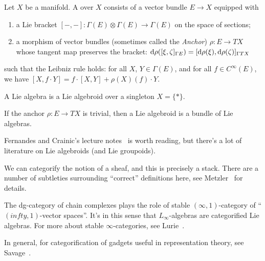 \begin{node}\label{hda-000C}%
\begin{definition}\label{hda-0003}%
Let $X$ be a manifold. A  over $X$ consists of
a vector bundle $E\to X$ equipped with
\begin{enumerate}
\item a Lie bracket $[-,-]\colon\Gamma(E)\otimes\Gamma(E)\to\Gamma(E)$
  on the space of sections;
\item a morphism of vector bundles (sometimes called the \textit{Anchor})
  $\rho\colon E\to TX$ whose tangent map preserves the bracket:
  $\mathrm{d}\rho([\xi,\zeta]_{\Gamma E})=[\mathrm{d}\rho(\xi),\mathrm{d}\rho(\zeta)]_{\Gamma TX}$
\end{enumerate}
such that the Leibniz rule holds: for all $X$, $Y\in\Gamma(E)$, and for
all $f\in C^{\infty}(E)$, we have $[X,f\cdot Y]=f\cdot[X,Y]+\rho(X)(f)\cdot Y$.
\end{definition}

\begin{node}[Examples]\label{hda-000D}%

\begin{node}\label{hda-000E}%
A Lie algebra is a Lie algebroid over a singleton $X=\{*\}$.
\end{node}

\begin{node}\label{hda-000F}%
If the anchor $\rho\colon E\to TX$ is trivial, then a Lie algebroid is a
bundle of Lie algebras.
\end{node}
\end{node}

\begin{node}\label{hda-000G}%
Fernandes and Crainic's lecture notes~\cite{fernandes2006lectures}
is worth reading, but there's a lot of literature on Lie algebroids (and
Lie groupoids).
\end{node}
\end{node}

\begin{node}[Stacks]\label{hda-000H}%
We can categorify the notion of a sheaf, and this is precisely a
stack. There are a number of subtleties surrounding ``correct''
definitions here, see Metzler~\cite{metzler2003topological} for details.
\end{node}

\begin{node}\label{hda-000I}%
The dg-category of chain complexes plays the role of stable
$(\infty,1)$-category of ``$(infty,1)$-vector spaces''. It's in this
sense that $L_{\infty}$-algebras are categorified Lie algebras. For more
about stable $\infty$-categories, see Lurie~\cite{lurie2009stable}.
\end{node}

\begin{node}\label{hda-000J}%
In general, for categorification of gadgets useful in representation
theory, see Savage~\cite{savage2015introduction}.
\end{node}
